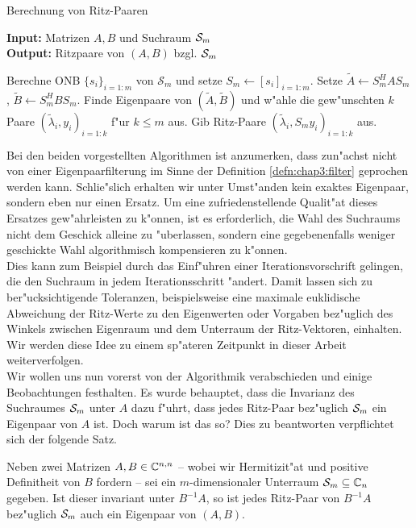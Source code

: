 \begin{algorithm}
\caption{Berechnung von Ritz-Paaren}\label{alg:chap3:grp}
\vspace{.15cm}
\textbf{Input:} Matrizen $A,B$ und Suchraum $\S_m$\\
\textbf{Output:} Ritzpaare von $(A,B)$ bzgl. $\S_m$
\begin{algorithmic}[1]
\State Berechne ONB $\{s_i\}_{i=1:m}$ von $\mathcal{S}_m$ und setze $S_m\gets[s_i]_{i=1:m}$.
\State Setze $\widetilde{A}\gets S_m^H A S_m$,
$\widetilde{B} \gets S_m^H BS_m$.
\State Finde Eigenpaare von $(\widetilde{A},\widetilde{B})$ und w"ahle die gew"unschten $k$ Paare $(\widetilde{\lambda}_i,y_i)_{i=1:k}$ f"ur $k\le m$ aus.
\State Gib Ritz-Paare $(\widetilde{\lambda}_i, S_m y_i)_{i=1:k}$ aus.
\end{algorithmic}
\end{algorithm}

Bei den beiden vorgestellten Algorithmen ist anzumerken, dass zun"achst nicht von einer Eigenpaarfilterung im Sinne der Definition \ref{defn:chap3:filter} geprochen werden kann.
Schlie"slich erhalten wir unter Umst"anden kein exaktes Eigenpaar, sondern eben nur einen Ersatz.
Um eine zufriedenstellende Qualit"at dieses Ersatzes gew"ahrleisten zu k"onnen, ist es erforderlich, die Wahl des Suchraums nicht dem Geschick alleine zu "uberlassen, sondern eine gegebenenfalls weniger geschickte Wahl algorithmisch kompensieren zu k"onnen.\\

Dies kann zum Beispiel durch das Einf"uhren einer Iterationsvorschrift gelingen, die den Suchraum in jedem Iterationsschritt "andert.
Damit lassen sich zu ber"ucksichtigende Toleranzen, beispielsweise eine maximale euklidische Abweichung der Ritz-Werte zu den Eigenwerten oder Vorgaben bez"uglich des Winkels zwischen Eigenraum und dem Unterraum der Ritz-Vektoren, einhalten.
Wir werden diese Idee zu einem sp"ateren Zeitpunkt in dieser Arbeit weiterverfolgen.\\

Wir wollen uns nun vorerst von der Algorithmik verabschieden und einige Beobachtungen
festhalten. Es wurde behauptet, dass die Invarianz des Suchraumes $\S_m$ unter
$A$ dazu f"uhrt, dass jedes Ritz-Paar bez"uglich $\S_m$ ein Eigenpaar von $A$ ist.
Doch warum ist das so? Dies zu beantworten verpflichtet sich der folgende Satz.

\newpage

\begin{thm}\label{thm:chap3:invariant}
Neben zwei Matrizen $A,B\in\Cnn$ -- wobei wir Hermitizit"at und positive Definitheit von $B$ fordern -- sei ein $m$-dimensionaler Unterraum $\S_m \subseteq \C_n$ gegeben.
Ist dieser invariant unter $B^{-1}A$, so ist jedes Ritz-Paar von $B^{-1}A$
bez"uglich $\S_m$ auch ein Eigenpaar von $(A,B)$.
\end{thm}

